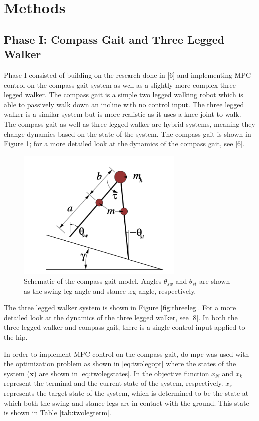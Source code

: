 \documentclass{./springer/svjour3}
\newcommand{\mb}[1]{\mathbf{#1}}
\begin{document}
\section{Methods}

\subsection{Phase I: Compass Gait and Three Legged Walker}

Phase I consisted of building on the research done in [6] and implementing MPC control on the compass gait system as well as a slightly more complex three legged walker.
The compass gait is a simple two legged walking robot which is able to passively walk down an incline with no control input. The three legged walker is a similar system 
but is more realistic as it uses a knee joint to walk. The compass gait as well as three legged walker are hybrid systems, meaning they change dynamics based on the state of the system.
The compass gait is shown in Figure \ref{fig:compass_gait}; for a more detailed look at the dynamics of the compass gait, see [6].

\begin{figure}[!h]
  \centering
  \includegraphics[width=8cm]{./figures/compassgaitmodel.png}
  \caption{Schematic of the compass gait model. Angles $\theta_{sw}$ and $\theta_{st}$ are shown as the swing leg angle and stance leg angle, respectively.}
  \label{fig:compass_gait}
\end{figure}

The three legged walker system is shown in Figure \ref{fig:threeleg}. For a more detailed look at the dynamics of the three legged walker, see [8]. In both the three legged walker and
compass gait, there is a single control input applied to the hip.

In order to implement MPC control on the compass gait, do-mpc was used with the optimization problem as shown in \ref{eq:twolegopt} where the states of the system ($\mb{x}$)
are shown in \ref{eq:twolegstates}. In the objective function $x_N$ and $x_k$ represent the terminal and the current state of the system, respectively.
$x_r$ represents the target state of the system, which is determined to be the state at which both the swing and stance legs are in contact with the ground. This state 
is shown in Table \ref{tab:twolegterm}.
\end{document}
